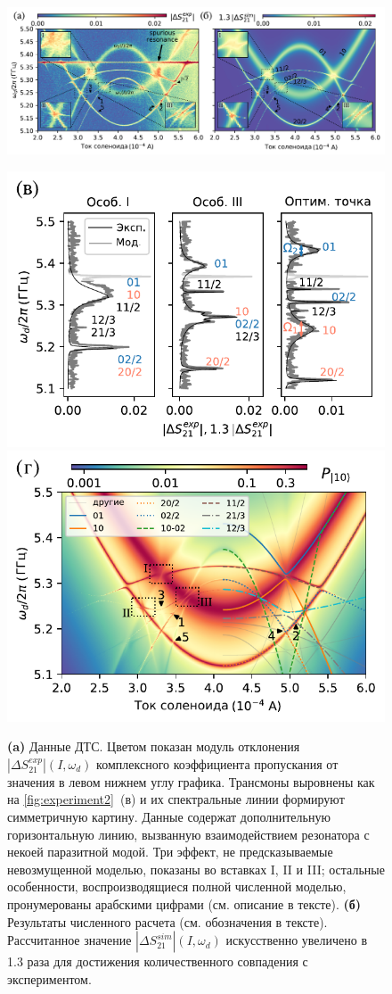 \documentclass[14pt, a4paper]{extreport}
\numberwithin{equation}{section}
\begin{document}
\begin{figure}
	
	\centering
	\includegraphics[width=\linewidth]{main_picture}
	
	\includegraphics[width=.495\linewidth]{main_picture_slices}
	\includegraphics[width=.495\linewidth]{stationary}
	\caption{\textbf{(a)} 
		Данные ДТС. Цветом показан модуль отклонения $|\Delta S^{exp}_{21}| (I, \omega_d)$ комплексного коэффициента пропускания от значения в левом нижнем углу графика. 
		Трансмоны выровнены как на 
		\autoref{fig:experiment2}~(в) и их спектральные линии формируют симметричную картину. Данные содержат дополнительную горизонтальную линию, вызванную взаимодействием резонатора с некоей паразитной модой. Три эффект, не предсказываемые невозмущенной моделью, показаны во вставках I, II и III; остальные особенности, воспроизводящиеся полной численной моделью, пронумерованы арабскими цифрами (см. описание в тексте). \textbf{(б)} Результаты численного расчета (см. обозначения в тексте). Рассчитанное значение $|\Delta S^{sim}_{21}| (I, \omega_d)$ искусственно увеличено в 1.3 раза для достижения количественного совпадения с экспериментом.
}
\end{figure}
\end{document}
